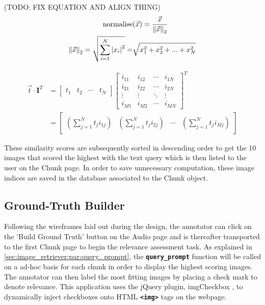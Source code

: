 \documentclass{l4proj}
\begin{document}
(TODO: FIX EQUATION AND ALIGN THING)
\begin{equation}
\begin{align*}
    \text{normalise}&(\vec{x}) = \frac{\vec{x}}{\norm{\vec{x}}_2} \\
    \norm{\vec{x}}_2 = \sqrt{\sum_{i=1}^N \abs{x_i}^2} =& \sqrt{x_1^2 + x_2^2 + ... + x_N^2}
    \label{eq:euclidean_normalisation}
\end{align*}
\end{equation}

\begin{equation}
\begin{align*}
    \vec{t} \cdot \mathbf{I}^T &= 
    \begin{bmatrix}
        t_1  & t_2 & \cdots & t_N
    \end{bmatrix}
    \begin{bmatrix}
        i_{11} & i_{12} & \cdots & i_{1N} \\
        i_{21} & i_{22} & \cdots & i_{2N} \\
        \vdots & \vdots & \ddots & \vdots \\
        i_{M1} & i_{M2} & \cdots & i_{MN}
    \end{bmatrix}^T \\
    &=
    \begin{bmatrix}
        \left( \sum_{j=1}^N t_ji_{1j} \right) & \left( \sum_{j=1}^N t_ji_{2j} \right) & \cdots & \left( \sum_{j=1}^N t_ji_{Mj} \right)
    \end{bmatrix}
    \label{eq:dot_product}
\end{align*}
\end{equation}

These similarity scores are subsequently sorted in descending order to get the 10 images that scored the highest with the text query which is then listed to the user on the Chunk page. In order to save unnecessary computation, these image indices are saved in the database associated to the Chunk object.


\subsection{Ground-Truth Builder}
Following the wireframes laid out during the design, the annotator can click on the 'Build Ground Truth' button on the Audio page and is thereafter transported to the first Chunk page to begin the relevance assessment task. As explained in \ref{sec:image_retriever:par:query_prompt}, the \textbf{\lstinline|query_prompt|} function will be called on a ad-hoc basis for each chunk in order to display the highest scoring images. The annotator can then label the most fitting images by placing a check mark to denote relevance. This application uses the jQuery plugin, imgCheckbox \citep{imgcheckbox}, to dynamically inject checkboxes onto HTML \textbf{\lstinline|<img>|} tags on the webpage. 
\end{document}

